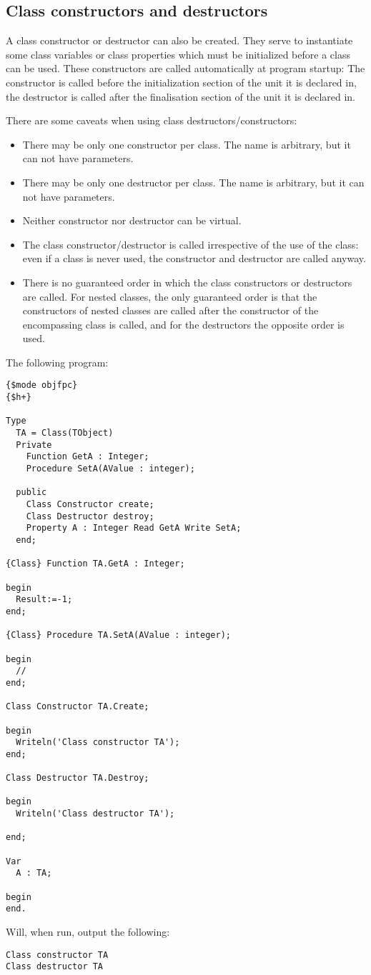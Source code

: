 \subsection{Class constructors and destructors}
A class constructor or destructor can also be created. They serve to instantiate some class variables or class properties which must be initialized before a class can be used.
These constructors are called automatically at program startup: The constructor is called before the initialization section of the unit it is declared in, the destructor is
called after the finalisation section of the unit it is declared in.

There are some caveats when using class destructors/constructors:
\begin{itemize}
\item There may be only one constructor per class. The name is arbitrary, but it can not have parameters.
\item There may be only one destructor per class. The name is arbitrary, but it can not have parameters.
\item Neither constructor nor destructor can be virtual.
\item The class constructor/destructor is called irrespective of the use of the class: even if a class is never used, the constructor and destructor are called anyway.
\item There is no guaranteed order in which the class constructors or destructors are called.
For nested classes, the only guaranteed order is that the constructors of
nested classes are called after the constructor of the encompassing class is
called, and for the destructors the opposite order is used.
\end{itemize}

The following program:

\begin{verbatim}
{$mode objfpc}
{$h+}

Type
  TA = Class(TObject)
  Private
    Function GetA : Integer;
    Procedure SetA(AValue : integer);

  public
    Class Constructor create;
    Class Destructor destroy;
    Property A : Integer Read GetA Write SetA;
  end;

{Class} Function TA.GetA : Integer;

begin
  Result:=-1;
end;

{Class} Procedure TA.SetA(AValue : integer);

begin
  //
end;

Class Constructor TA.Create;

begin
  Writeln('Class constructor TA');
end;

Class Destructor TA.Destroy;

begin
  Writeln('Class destructor TA');

end;

Var
  A : TA;

begin
end.
\end{verbatim}
Will, when run, output the following:
\begin{verbatim}
Class constructor TA
Class destructor TA
\end{verbatim}


